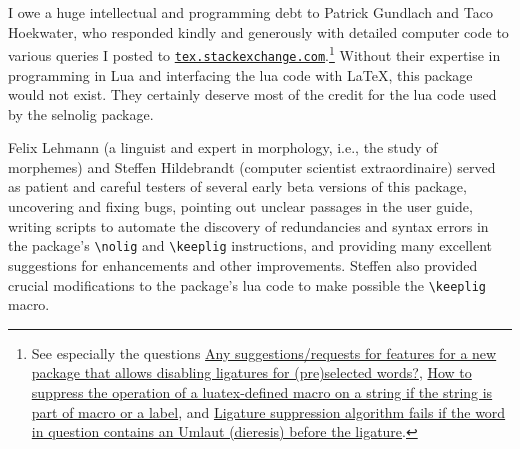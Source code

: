 \documentclass[11pt]{article}
\newcommand{\pkg}[1]{\textsf{#1}}
\newcommand{\cmmd}[1]{\texttt{\textbackslash #1}}
\begin{document}
\bigskip
I owe a huge intellectual and programming debt to Patrick Gundlach and Taco Hoekwater, who responded kindly and generously with detailed computer code to various queries I posted to \href{http://tex.stackexchange.com}{\texttt{tex.stackexchange.com}}.\footnote{See especially the questions \href{http://tex.stackexchange.com/q/37443/5001}{Any suggestions/requests for features for a new package that allows disabling ligatures for (pre)selected words?}, \href{http://tex.stackexchange.com/q/48516/5001}{How to suppress the operation of a luatex-defined macro on a string if the string is part of macro or a label}, and \href{http://tex.stackexchange.com/q/63005/5001}{Ligature suppression algorithm fails if the word in question contains an Umlaut (dieresis) before the ligature}.} Without their expertise in programming in Lua and interfacing the lua code with \LaTeX, this package would not exist. They certainly deserve most of the credit for the lua code used by the \pkg{selnolig} package.

Felix Lehmann (a linguist and expert in morphology, i.e., the study of morphemes) and Steffen Hildebrandt (computer scientist extraordinaire) served as patient and careful testers of several early beta versions of this package, uncovering and fixing bugs, pointing out unclear passages in the user guide, writing scripts to automate the discovery of redundancies and syntax errors in the package's \cmmd{nolig} and \cmmd{keeplig} instructions, and providing many excellent suggestions for enhancements and other improvements. Steffen also provided crucial modifications to the package's lua code to make possible the \cmmd{keeplig} macro.
\end{document}
